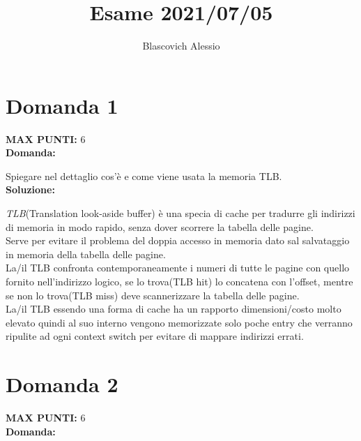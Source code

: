 \documentclass{article}
\title{Esame 2021/07/05}
\author{Blascovich Alessio}
\date{}
\begin{document}
    \maketitle
    \section*{Domanda 1}
    \textbf{MAX PUNTI:} 6\\
    \textbf{Domanda:}


    Spiegare nel dettaglio cos'è e come viene usata la memoria TLB.\\
    \textbf{Soluzione:}


    \emph{TLB}(Translation look-aside buffer) è una specia di cache per tradurre gli indirizzi di memoria in modo rapido, senza dover scorrere la tabella delle pagine.\\
    Serve per evitare il problema del doppia accesso in memoria dato sal salvataggio in memoria della tabella delle pagine.\\
    La/il TLB confronta contemporaneamente i numeri di tutte le pagine con quello fornito nell'indirizzo logico, se lo trova(TLB hit) lo concatena con l'offset, mentre se non lo trova(TLB miss) deve scannerizzare la tabella delle pagine.\\
    La/il TLB essendo una forma di cache ha un rapporto dimensioni/costo molto elevato quindi al suo interno vengono memorizzate solo poche entry che verranno ripulite ad ogni context switch per evitare di mappare indirizzi errati.
    \section*{Domanda 2}
    \textbf{MAX PUNTI:} 6\\
    \textbf{Domanda:}
\end{document}

